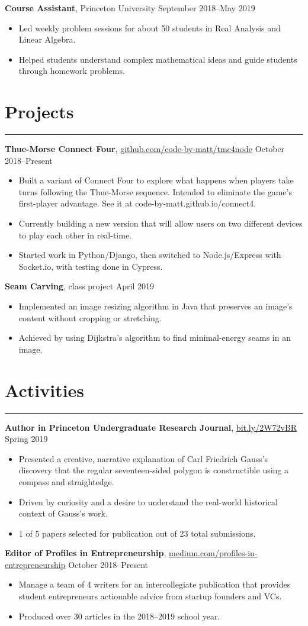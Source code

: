 \documentclass[10pt]{article}
\newcommand{\resumesection}[1]{\vspace{-0.2cm}\section*{#1}\vspace{-0.2cm}\hrule\vspace{0.2cm}}
\begin{document}
\textbf{Course Assistant}, Princeton University \hfill September 2018--May 2019
\begin{itemize}
	\item Led weekly problem sessions for about 50 students in Real Analysis and Linear Algebra.
	\item Helped students understand complex mathematical ideas and guide students through homework problems.
\end{itemize}

\resumesection{Projects}

\textbf{Thue-Morse Connect Four}, \href{https://github.com/code-by-matt/tmc4node}{github.com/code-by-matt/tmc4node}  \hfill October 2018--Present
\begin{itemize}
	\item Built a variant of Connect Four to explore what happens when players take turns following the Thue-Morse sequence. Intended to eliminate the game's first-player advantage. See it at code-by-matt.github.io/connect4.
	\item Currently building a new version that will allow users on two different devices to play each other in real-time.
	\item Started work in Python/Django, then switched to Node.js/Express with Socket.io, with testing done in Cypress.
\end{itemize}

\textbf{Seam Carving}, class project \hfill April 2019
\begin{itemize}
	\item Implemented an image resizing algorithm in Java that preserves an image's content without cropping or stretching.
	\item Achieved by using Dijkstra's algorithm to find minimal-energy seams in an image.
\end{itemize}

\resumesection{Activities}

\textbf{Author in Princeton Undergraduate Research Journal}, \href{https://bit.ly/2W72vBR}{bit.ly/2W72vBR} \hfill Spring 2019
\begin{itemize}
	\item Presented a creative, narrative explanation of Carl Friedrich Gauss's discovery that the regular seventeen-sided polygon is constructible using a compass and straightedge.
	\item Driven by curiosity and a desire to understand the real-world historical context of Gauss's work.
	\item 1 of 5 papers selected for publication out of 23 total submissions.
\end{itemize}

\textbf{Editor of Profiles in Entrepreneurship}, \href{https://medium.com/profiles-in-entrepreneurship}{medium.com/profiles-in-entrepreneurship} \hfill October 2018--Present
\begin{itemize}
	\item Manage a team of 4 writers for an intercollegiate publication that provides student entrepreneurs actionable advice from startup founders and VCs.
	\item Produced over 30 articles in the 2018--2019 school year.
\end{itemize}
\end{document}
